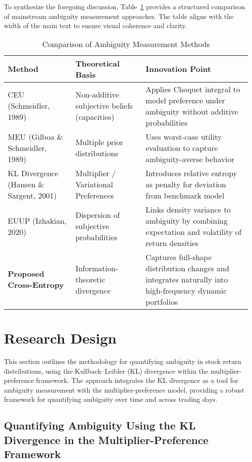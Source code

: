 \documentclass[preprint,12pt,authoryear]{elsarticle}
\begin{document}
To synthesize the foregoing discussion, Table~\ref{tab:ambiguity_methods} provides a structured comparison of mainstream ambiguity measurement approaches. The table aligns with the width of the main text to ensure visual coherence and clarity.
\begin{table}[H]
  \centering
  \caption{Comparison of Ambiguity Measurement Methods}
  \label{tab:ambiguity_methods}
  \renewcommand{\arraystretch}{1.3}
  \begin{tabularx}{\linewidth}{>{\raggedright\arraybackslash}X >{\raggedright\arraybackslash}X p{}}
    \toprule
    \textbf{Method} & \textbf{Theoretical Basis} & \textbf{Innovation Point} \\
    \midrule
    CEU (Schmeidler, 1989) & Non-additive subjective beliefs (capacities) & Applies Choquet integral to model preference under ambiguity without additive probabilities \\
    MEU (Gilboa \& Schmeidler, 1989) & Multiple prior distributions & Uses worst-case utility evaluation to capture ambiguity-averse behavior \\
    KL Divergence (Hansen \& Sargent, 2001) & Multiplier / Variational Preferences & Introduces relative entropy as penalty for deviation from benchmark model \\
    EUUP (Izhakian, 2020) & Dispersion of subjective probabilities & Links density variance to ambiguity by combining expectation and volatility of return densities \\
    \textbf{Proposed Cross-Entropy} & Information-theoretic divergence & Captures full-shape distribution changes and integrates naturally into high-frequency dynamic portfolios \\
    \bottomrule
  \end{tabularx}
\end{table}


\section{Research Design}
This section outlines the methodology for quantifying ambiguity in stock return distributions, using the Kullback–Leibler (KL) divergence within the multiplier-preference framework. The approach integrates the KL divergence as a tool for ambiguity measurement with the multiplier-preference model, providing a robust framework for quantifying ambiguity over time and across trading days.

\subsection{Quantifying Ambiguity Using the KL Divergence in the Multiplier-Preference Framework}
\end{document}
